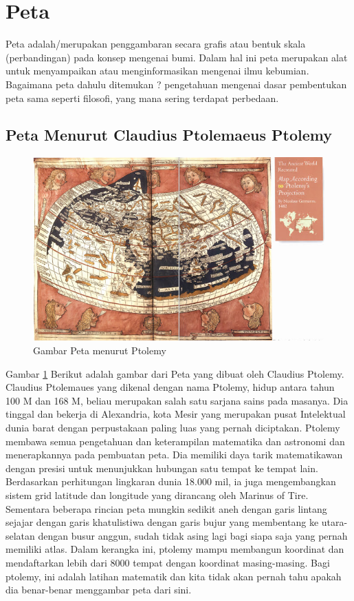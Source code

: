 
\section{Peta}
	Peta adalah/merupakan penggambaran secara grafis atau bentuk skala (perbandingan) pada konsep mengenai bumi. Dalam hal ini peta merupakan alat untuk menyampaikan atau menginformasikan mengenai ilmu kebumian. Bagaimana peta dahulu ditemukan ? pengetahuan mengenai dasar pembentukan peta sama seperti filosofi, yang mana sering terdapat perbedaan.

\subsection{Peta Menurut Claudius Ptolemaeus Ptolemy}
	\begin{figure} [ht]
	\centerline{\includegraphics[width=.5\textwidth]{figures/PetaPtolemy}}
	\caption{Gambar Peta menurut Ptolemy}
	\label{PetaPtolemy}
	\end{figure}
	Gambar \ref {PetaPtolemy} Berikut adalah gambar dari Peta yang dibuat oleh Claudius Ptolemy.
	Claudius Ptolemaues yang dikenal dengan nama Ptolemy, hidup antara tahun 100 M dan 168 M, beliau merupakan salah satu sarjana sains pada masanya. Dia tinggal dan bekerja di Alexandria, kota Mesir yang merupakan pusat Intelektual dunia barat dengan perpustakaan paling luas yang pernah diciptakan. Ptolemy membawa semua pengetahuan dan keterampilan matematika dan astronomi dan menerapkannya pada pembuatan peta. Dia memiliki daya tarik matematikawan dengan presisi untuk menunjukkan hubungan satu tempat ke tempat lain. Berdasarkan perhitungan lingkaran dunia 18.000 mil, ia juga mengembangkan sistem grid latitude dan longitude yang dirancang oleh Marinus of Tire. Sementara beberapa rincian peta mungkin sedikit aneh dengan garis lintang sejajar dengan garis khatulistiwa dengan garis bujur yang membentang ke utara-selatan dengan busur anggun, sudah tidak asing lagi bagi siapa saja yang pernah memiliki atlas. Dalam kerangka ini, ptolemy mampu membangun koordinat dan mendaftarkan lebih dari 8000 tempat dengan koordinat masing-masing. Bagi ptolemy, ini adalah latihan matematik dan kita tidak akan pernah tahu apakah dia benar-benar menggambar peta dari sini.
